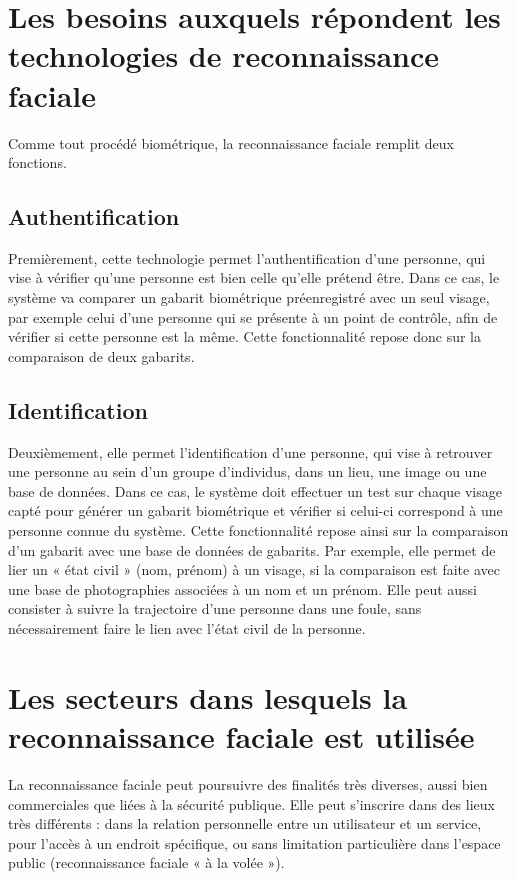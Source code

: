 \documentclass[12pt,french]{article}
\theoremstyle{plain}
\theoremstyle{definition}
\begin{document}
\section{Les besoins auxquels répondent les technologies de reconnaissance faciale}
Comme tout procédé biométrique, la reconnaissance faciale remplit deux fonctions.

\subsection{Authentification}
Premièrement, cette technologie permet l’authentification d’une personne, qui vise à vérifier qu’une personne est bien celle qu’elle prétend être. Dans ce cas, le système va comparer un gabarit biométrique préenregistré avec un seul visage, par exemple celui d’une personne qui se présente à un point de contrôle, afin de vérifier si cette personne est la même.
Cette fonctionnalité repose donc sur la comparaison de deux gabarits.

\subsection{Identification}
Deuxièmement, elle permet l’identification d’une personne, qui vise à retrouver une personne au sein d’un groupe d’individus, dans un lieu, une image ou une base de données.
Dans ce cas, le système doit effectuer un test sur chaque visage capté pour générer un gabarit biométrique et vérifier si celui-ci correspond à une personne connue du système.
Cette fonctionnalité repose ainsi sur la comparaison d’un gabarit avec une base de données de gabarits.
Par exemple, elle permet de lier un « état civil » (nom, prénom) à un visage, si la comparaison est faite avec une base de photographies associées à un nom et un prénom.
Elle peut aussi consister à suivre la trajectoire d’une personne dans une foule, sans nécessairement faire le lien avec l’état civil de la personne.

\section{Les secteurs dans lesquels la reconnaissance faciale est utilisée}
La reconnaissance faciale peut poursuivre des finalités très diverses, aussi bien commerciales que liées à la sécurité publique.
Elle peut s’inscrire dans des lieux très différents : dans la relation personnelle entre un utilisateur et un service, pour l’accès à un endroit spécifique, ou sans limitation particulière dans l’espace public (reconnaissance faciale « à la volée »).
\end{document}
